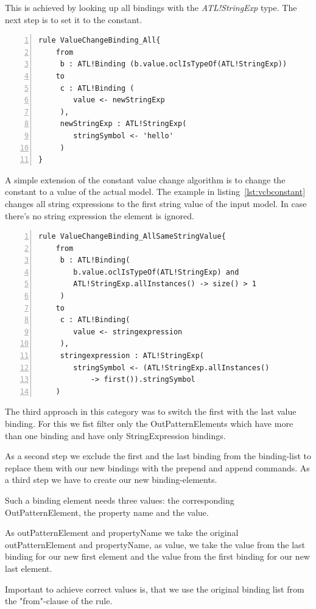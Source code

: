 \documentclass{llncs}
\begin{document}
This is achieved by looking up all bindings with the \emph{ATL!StringExp} type. The next step is to set it to the constant.

\begin{lstlisting}[language=ATL, numbers=left,xleftmargin=5.0ex, caption=ValueChangeBinding-Definition., label=lst:valuechangebinding1]
rule ValueChangeBinding_All{
	from
	 b : ATL!Binding (b.value.oclIsTypeOf(ATL!StringExp))
	to
	 c : ATL!Binding (
	 	value <- newStringExp
	 ),
	 newStringExp : ATL!StringExp(
	 	stringSymbol <- 'hello'	
	 )
}
\end{lstlisting}

A simple extension of the constant value change algorithm is to change the constant to a value of the actual model. The example in listing~\ref{lst:vcbconstant} changes all string expressions to the first string value of the input model. In case there's no string expression the element is ignored.

\begin{lstlisting}[language=ATL, numbers=left,xleftmargin=5.0ex, caption=ValueChangeBinding-Definition using same constant string value., label=lst:vcbconstant]
rule ValueChangeBinding_AllSameStringValue{
	from
	 b : ATL!Binding(
	 	b.value.oclIsTypeOf(ATL!StringExp) and 
		ATL!StringExp.allInstances() -> size() > 1
	 )
	to
	 c : ATL!Binding(
	 	value <- stringexpression
	 ), 
	 stringexpression : ATL!StringExp(
	 	stringSymbol <- (ATL!StringExp.allInstances() 
			-> first()).stringSymbol
	)
\end{lstlisting}

The third approach in this category was to switch the first with the last value binding. For this we fist filter only the OutPatternElements which have more than one binding and have only StringExpression bindings.

As a second step we exclude the first and the last binding from the binding-list to replace them with our new bindings with the prepend and append commands. As a third step we have to create our new binding-elements.

Such a binding element needs three values: the corresponding OutPatternElement, the property name and the value.

As outPatternElement and propertyName we take the original outPatternElement and propertyName, as value, we take the value from the last binding for our new first element and the value from the first binding for our new last element.

Important to achieve correct values is, that we use the original binding list from the "from"-clause of the rule.
\end{document}
